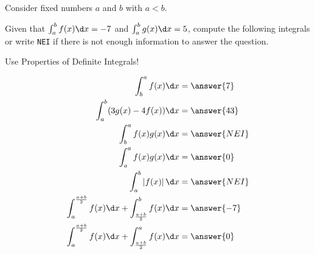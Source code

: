 \documentclass{ximera}
\author{Nela Lakos \and Kyle Parsons}
\begin{document}
\begin{exercise}

Consider fixed numbers $a$ and $b$ with $a<b$.

 Given that $\int_a^b f(x) \d x = -7$ and $\int_a^b g(x) \d x = 5$, compute the following integrals or write \verb|NEI| if there is not enough information to answer the question.
\begin{hint}
Use Properties of  Definite Integrals!
\end{hint}
\begin{align*}
\int_b^a f(x) \d x &= \answer{7}\\
\int_a^b (3g(x) - 4f(x)) \d x &= \answer{43}\\
\int_b^a f(x)g(x) \d x &= \answer{NEI}\\
\int_a^a f(x)g(x) \d x &= \answer{0}\\
\int_a^b \left|f(x)\right| \d x &= \answer{NEI}\\
\int_a^{\frac{a+b}{2}} f(x) \d x + \int_{\frac{a+b}{2}}^b f(x) \d x &= \answer{-7}\\
\int_a^{\frac{a+b}{2}} f(x) \d x + \int_{\frac{a+b}{2}}^a f(x) \d x &= \answer{0}\\
\end{align*}

\end{exercise}
\end{document}
